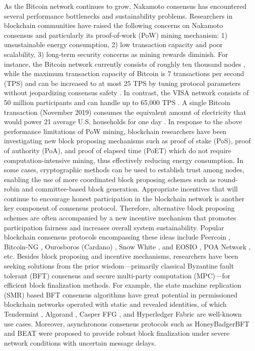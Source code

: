 As the Bitcoin network continues to grow, Nakamoto consensus has encountered several performance bottlenecks and sustainability problems. Researchers in blockchain communities have raised the following concerns on Nakamoto consensus and particularly its proof-of-work (PoW) mining mechanism: 1) unsustainable energy consumption, 2) low transaction capacity and poor scalability, 3) long-term security concerns as mining rewards diminish. For instance, the Bitcoin network currently consists of roughly ten thousand nodes , while the maximum transaction capacity of Bitcoin is 7 transactions per second (TPS) and can be increased to at most 25 TPS by tuning protocol parameters without jeopardizing consensus safety . In contrast, the VISA network consists of 50 million participants and can handle up to 65,000 TPS . A single Bitcoin transaction (November 2019) consumes the equivalent amount of electricity that would power 21 average U.S. households for one day . 
In response to the above performance limitations of PoW mining, blockchain researchers have been investigating new block proposing mechanisms such as proof of stake (PoS), proof of authority (PoA), and proof of elapsed time (PoET) which do not require computation-intensive mining, thus effectively reducing energy consumption. In some cases, cryptographic methods can be used to establish trust among nodes, enabling the use of more coordinated block proposing schemes such as round-robin and committee-based block generation. Appropriate incentives that will continue to encourage honest participation in the blockchain network is another key component of consensus protocol. Therefore, alternative block proposing schemes are often accompanied by a new incentive mechanism that promotes participation fairness and increases overall system sustainability. Popular blockchain consensus protocols encompassing these ideas include Peercoin , Bitcoin-NG , Ourosboros (Cardano) , Snow White , and EOSIO , POA Network , etc.
Besides block proposing and incentive mechanisms, researchers have been seeking solutions from the prior wisdom---primarily {\color{\rcolor}classical Byzantine fault tolerant (BFT) consensus and secure multi-party computation (MPC)}---for efficient block finalization methods. For example, the state machine replication (SMR) based BFT consensus algorithms have great potential in permissioned blockchain networks operated with static and revealed identities, of which Tendermint , Algorand , Casper FFG , and Hyperledger Fabric  are well-known use cases. Moreover, asynchronous consensus protocols such as HoneyBadgerBFT  and BEAT  were proposed to provide robust block finalization under severe network conditions with uncertain message delays.
